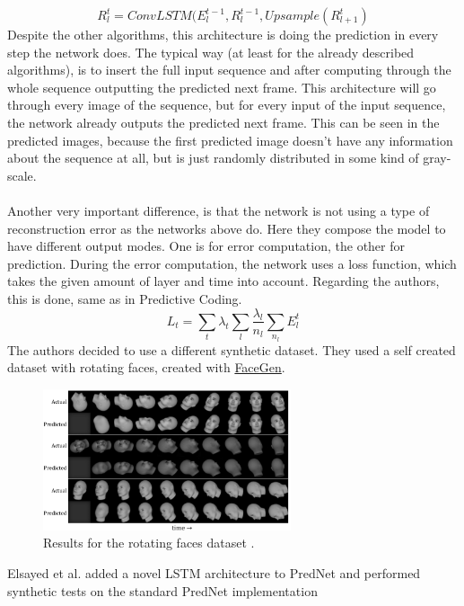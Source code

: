   \begin{equation}
   R_l^t = ConvLSTM(E_l^{t-1}, R_l^{t-1}, Upsample(R_{l+1}^t)
  \end{equation}\noindent
 Despite the other algorithms, this architecture is doing the prediction in every step the network does. The typical way (at least for the already described 
 algorithms), is to insert the full input sequence and after computing through the whole sequence outputting the predicted next frame. This architecture will go
 through every image of the sequence, but for every input of the input sequence, the network already outputs the predicted next frame. This can be seen in the
 predicted images, because the first predicted image doesn't have any information about the sequence at all, but is just randomly distributed in some
 kind of gray-scale.
 \\\\
 Another very important difference, is that the network is not using a type of reconstruction error as the networks above do. Here they compose the model to
 have different output modes. One is for error computation, the other for prediction. During the error computation, the network uses a loss function, which takes
 the given amount of layer and time into account. Regarding the authors, this is done, same as in Predictive Coding.
 \begin{equation}
  L_t = \sum_{t}\lambda_t \sum_l \frac{\lambda_l}{n_l} \sum_{n_l}E_l^t
 \end{equation}
 The authors decided to use a different synthetic dataset. They used a self created dataset with rotating faces, created with \href{https://facegen.com/}
 {FaceGen}.
 \begin{figure}[H]
   \includegraphics[width=0.65\textwidth]{../Images/prednet.png}
   \centering
   \caption{Results for the rotating faces dataset \cite{Lotter2016}.}
   \label{fig:lotter_rotation}
 \end{figure}\noindent
 Elsayed et al. \cite{Elsayed2018} added a novel LSTM architecture to PredNet and performed synthetic tests on the standard PredNet implementation
